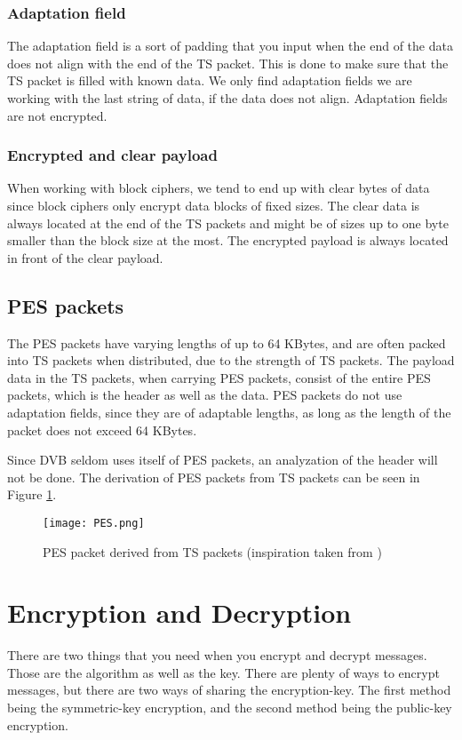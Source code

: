 \subsubsection{Adaptation field}
The adaptation field is a sort of padding that you input when the end of the 
data does not align with the end of the TS packet. This is done to make sure 
that the TS packet is filled with known data. We only find adaptation fields we 
are working with the last string of data, if the data does not align. Adaptation 
fields are not encrypted. \cite[pp. 10--11]{DVB:2013}

\subsubsection{Encrypted and clear payload}
When working with block ciphers, we tend to end up with clear bytes of data 
since block ciphers only encrypt data blocks of fixed sizes. The clear data 
is always located at the end of the TS packets and might be of sizes up to one 
byte smaller than the block size at the most. The encrypted payload is always 
located in front of the clear payload. \cite[pp. 10--11]{DVB:2013}

\subsection{PES packets}
The PES packets have varying lengths of up to 64 KBytes, and are often packed 
into TS packets when distributed, due to the strength of TS packets. The payload 
data in the TS packets, when carrying PES packets, consist of the entire PES 
packets, which is the header as well as the data. PES packets do not use 
adaptation fields, since they are of adaptable lengths, as long as the length of 
the packet does not exceed 64 KBytes.

Since DVB seldom uses itself of PES packets, an analyzation of the header will 
not be done. The derivation of PES packets from TS packets can be seen in Figure \ref{img:PES}.


\begin{figure}
  \texttt{[image: PES.png]}
  \caption{PES packet derived from TS packets (inspiration taken from 
    \citep[p. 9]{ETR:289} ) }
  \label{img:PES}
\end{figure}

\section{Encryption and Decryption}
There are two things that you need when you encrypt and decrypt messages. Those 
are the algorithm as well as the key. There are plenty of ways to encrypt 
messages, but there are two ways of sharing the encryption-key. The first method 
being the symmetric-key encryption, and the second method being the public-key 
encryption.

